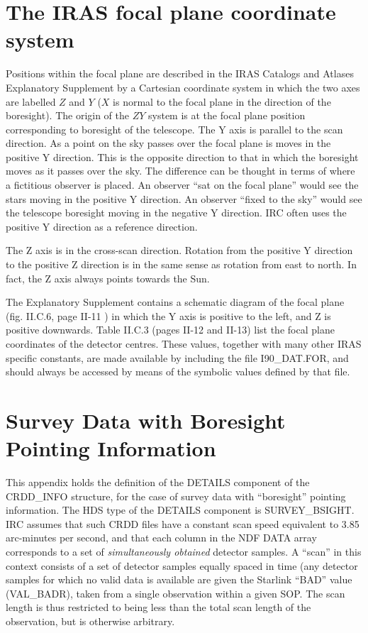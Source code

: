 \section {The IRAS focal plane coordinate system}
\label{APP:FOCALP}
Positions within the focal plane are described in the IRAS Catalogs and Atlases
Explanatory Supplement by a Cartesian coordinate system in which the two axes
are labelled $Z$ and $Y$ ($X$ is normal to the focal plane in the direction of
the boresight). The origin of the $ZY$ system is at the focal plane position
corresponding to boresight of the telescope. The Y axis is parallel to the scan
direction. As a point on the sky passes over the focal plane is moves in the
positive Y direction. This is the opposite direction to that in which the
boresight moves as it passes over the sky. The difference can be thought in
terms of where a fictitious observer is placed. An observer ``sat on the focal
plane'' would see the stars moving in the positive Y direction. An observer
``fixed to the sky'' would see the telescope boresight moving in the negative
Y direction. IRC often uses the positive Y direction as a reference direction.

The Z axis is in the cross-scan direction. Rotation from the positive Y
direction to the positive Z direction is in the same sense as rotation from
east to north. In fact, the Z axis always points towards the Sun.

The Explanatory Supplement contains a schematic diagram of the focal plane (fig.
 II.C.6, page II-11 ) in which the Y axis is positive to the left, and Z is
positive downwards. Table II.C.3 (pages II-12 and II-13) list the focal plane
coordinates of the detector centres. These values, together with many other IRAS
specific constants, are made available by including the file I90\_DAT.FOR, and
should always be accessed by means of the symbolic values defined by that file.

\section {Survey Data with Boresight Pointing Information}

This appendix holds the definition of the DETAILS component of the CRDD\_INFO
structure, for the case of survey data with ``boresight'' pointing information.
The HDS type of the DETAILS component is SURVEY\_BSIGHT. IRC assumes that such
CRDD files have a constant scan speed equivalent to 3.85 arc-minutes per second,
and that each column in the NDF DATA array corresponds to a set of {\em
simultaneously obtained} detector samples. A ``scan'' in this context consists
of a set of detector samples equally spaced in time (any detector samples for
which no valid data is available are given the Starlink ``BAD'' value
(VAL\_BADR), taken from a single observation within a given SOP. The scan length
is thus restricted to being less than the total scan length of the observation,
but is otherwise arbitrary.


